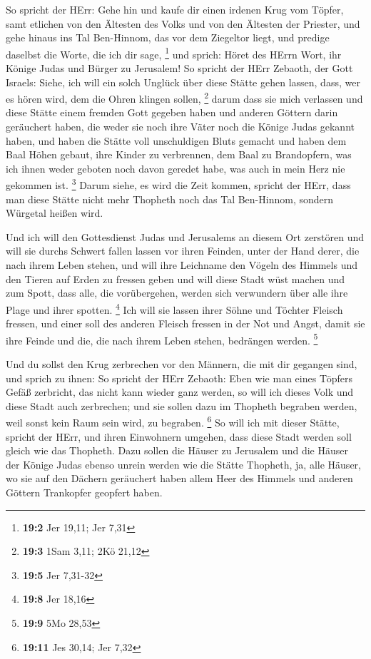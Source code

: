 So spricht der HErr: Gehe hin und kaufe dir einen irdenen
Krug vom Töpfer, samt etlichen von den Ältesten des Volks und von den
Ältesten der Priester,  und gehe hinaus ins Tal
Ben-Hinnom, das vor dem Ziegeltor liegt, und predige daselbst die Worte,
die ich dir sage, \footnote{\textbf{19:2} Jer 19,11; Jer 7,31}
 und sprich: Höret des HErrn Wort, ihr Könige Judas und
Bürger zu Jerusalem! So spricht der HErr Zebaoth, der Gott Israels:
Siehe, ich will ein solch Unglück über diese Stätte gehen lassen, dass,
wer es hören wird, dem die Ohren klingen sollen, \footnote{\textbf{19:3}
  1Sam 3,11; 2Kö 21,12}  darum dass sie mich verlassen und
diese Stätte einem fremden Gott gegeben haben und anderen Göttern darin
geräuchert haben, die weder sie noch ihre Väter noch die Könige Judas
gekannt haben, und haben die Stätte voll unschuldigen Bluts gemacht
 und haben dem Baal Höhen gebaut, ihre Kinder zu
verbrennen, dem Baal zu Brandopfern, was ich ihnen weder geboten noch
davon geredet habe, was auch in mein Herz nie gekommen ist. \footnote{\textbf{19:5}
  Jer 7,31-32}  Darum siehe, es wird die Zeit kommen,
spricht der HErr, dass man diese Stätte nicht mehr Thopheth noch das Tal
Ben-Hinnom, sondern Würgetal heißen wird.

 Und ich will den Gottesdienst Judas und Jerusalems an
diesem Ort zerstören und will sie durchs Schwert fallen lassen vor ihren
Feinden, unter der Hand derer, die nach ihrem Leben stehen, und will
ihre Leichname den Vögeln des Himmels und den Tieren auf Erden zu
fressen geben  und will diese Stadt wüst machen und zum
Spott, dass alle, die vorübergehen, werden sich verwundern über alle
ihre Plage und ihrer spotten. \footnote{\textbf{19:8} Jer 18,16}
 Ich will sie lassen ihrer Söhne und Töchter Fleisch
fressen, und einer soll des anderen Fleisch fressen in der Not und
Angst, damit sie ihre Feinde und die, die nach ihrem Leben stehen,
bedrängen werden. \footnote{\textbf{19:9} 5Mo 28,53}

 Und du sollst den Krug zerbrechen vor den Männern, die
mit dir gegangen sind,  und sprich zu ihnen: So spricht
der HErr Zebaoth: Eben wie man eines Töpfers Gefäß zerbricht, das nicht
kann wieder ganz werden, so will ich dieses Volk und diese Stadt auch
zerbrechen; und sie sollen dazu im Thopheth begraben werden, weil sonst
kein Raum sein wird, zu begraben. \footnote{\textbf{19:11} Jes 30,14;
  Jer 7,32}  So will ich mit dieser Stätte, spricht der
HErr, und ihren Einwohnern umgehen, dass diese Stadt werden soll gleich
wie das Thopheth.  Dazu sollen die Häuser zu Jerusalem
und die Häuser der Könige Judas ebenso unrein werden wie die Stätte
Thopheth, ja, alle Häuser, wo sie auf den Dächern geräuchert haben allem
Heer des Himmels und anderen Göttern Trankopfer geopfert haben.

